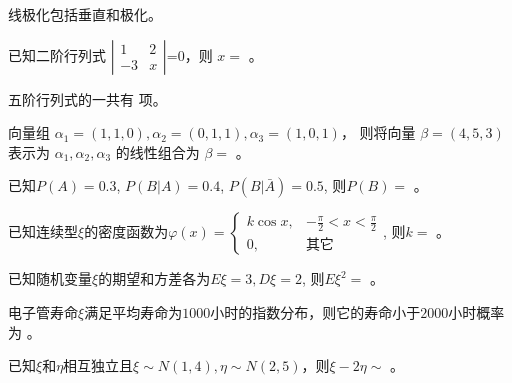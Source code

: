 \begin{question}
线极化包括垂直和极化。	
\end{question}


\begin{question}
已知二阶行列式 $\text{$\left|\begin{array}{cc}
  1 & 2\\
  - 3 & x
\end{array}\right|$=0}$，则 $x=$ 。
\end{question}

\begin{question}
五阶行列式的一共有  项。
\end{question}

\begin{question}
向量组 $\alpha_1=(1,1,0), \alpha_2=(0,1,1), \alpha_3=(1,0,1)$，
则将向量 $\beta=(4, 5, 3)$ 表示为 $\alpha_1, \alpha_2, \alpha_3$
的线性组合为 $\beta=$ 。
\end{question}



\begin{question}
已知$P(A)=0.3$, $P(B|A)=0.4$, $P(B|\bar{A})=0.5$, 则$P(B)=$ 。
\end{question}



\begin{question}
已知连续型$\xi$的密度函数为$\varphi(x)=\left\{
\begin{array}{ll}
  k \cos x, & - \frac{\pi}{2} < x < \frac{\pi}{2}\\
  0, & \text{其它}
\end{array}\right.$,
则$k=$ 。
\end{question}


\begin{question}
已知随机变量$\xi$的期望和方差各为$E\xi=3, D\xi=2$, 则$E\xi^2=$ 。
\end{question}



\begin{question}
电子管寿命$\xi$满足平均寿命为$1000$小时的指数分布，则它的寿命小于$2000$小时概率为 。
\end{question}



\begin{question}
已知$\xi$和$\eta$相互独立且$\xi\sim N(1,4), \eta\sim N(2,5)$，则$\xi-2\eta\sim$ 。
\end{question} 